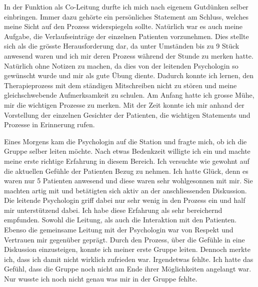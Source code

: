 In der Funktion als Co-Leitung durfte ich mich nach eigenem Gutdünken selber einbringen. Immer dazu gehörte ein persönliches Statement am Schluss, welches meine Sicht auf den Prozess widerspiegeln sollte. Natürlich war es auch meine Aufgabe, die Verlaufseinträge der einzelnen Patienten vorzunehmen. Dies stellte sich als die grösste Herausforderung dar, da unter Umständen bis zu 9 Stück anwesend waren und ich mir deren Prozess während der Stunde zu merken hatte. Natürlich ohne Notizen zu machen, da dies von der leitenden Psychologin so gewünscht wurde und mir als gute Übung diente. Dadurch konnte ich lernen, den Therapieprozess mit dem ständigen Mitschreiben nicht zu stören und meine gleichschwebende Aufmerksamkeit zu schulen. Am Anfang hatte ich grosse Mühe, mir die wichtigen Prozesse zu merken. Mit der Zeit konnte ich mir anhand der Vorstellung der einzelnen Gesichter der Patienten, die wichtigen Statements und Prozesse in Erinnerung rufen. 

Eines Morgens kam die Psychologin auf die Station und fragte mich, ob ich die Gruppe selber leiten möchte. Nach etwas Bedenkzeit willigte ich ein und machte meine erste richtige Erfahrung in diesem Bereich. Ich versuchte wie gewohnt auf die aktuellen Gefühle der Patienten Bezug zu nehmen. Ich hatte Glück, denn es waren nur 5 Patienten anwesend und diese waren sehr wohlgesonnen mit mir. Sie machten artig mit und betätigten sich aktiv an der anschliessenden Diskussion. Die leitende Psychologin griff dabei nur sehr wenig in den Prozess ein und half mir unterstützend dabei. Ich habe diese Erfahrung als sehr bereichernd empfunden. Sowohl die Leitung, als auch die Interaktion mit den Patienten. Ebenso die gemeinsame Leitung mit der Psychologin war von Respekt und Vertrauen mir gegenüber geprägt. Durch den Prozess, über die Gefühle in eine Diskussion einzusteigen, konnte ich meiner erste Gruppe leiten. Dennoch merkte ich, dass ich damit nicht wirklich zufrieden war. Irgendetwas fehlte. Ich hatte das Gefühl, dass die Gruppe noch nicht am Ende ihrer Möglichkeiten angelangt war. Nur wusste ich noch nicht genau was mir in der Gruppe fehlte. 

